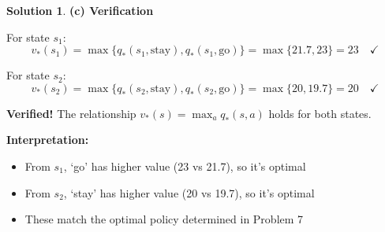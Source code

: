\documentclass[11pt]{article}
\theoremstyle{definition}
\newtheorem*{solution}{Solution}
\begin{document}
\begin{solution}
\textbf{(c) Verification}

For state $s_1$:
\[
v_*(s_1) = \max\{q_*(s_1, \text{stay}), q_*(s_1, \text{go})\} = \max\{21.7, 23\} = 23 \quad \checkmark
\]

For state $s_2$:
\[
v_*(s_2) = \max\{q_*(s_2, \text{stay}), q_*(s_2, \text{go})\} = \max\{20, 19.7\} = 20 \quad \checkmark
\]

\textbf{Verified!} The relationship $v_*(s) = \max_a q_*(s,a)$ holds for both states.

\textbf{Interpretation:}
\begin{itemize}
    \item From $s_1$, `go' has higher value (23 vs 21.7), so it's optimal
    \item From $s_2$, `stay' has higher value (20 vs 19.7), so it's optimal
    \item These match the optimal policy determined in Problem 7
\end{itemize}
\end{solution}
\end{document}
